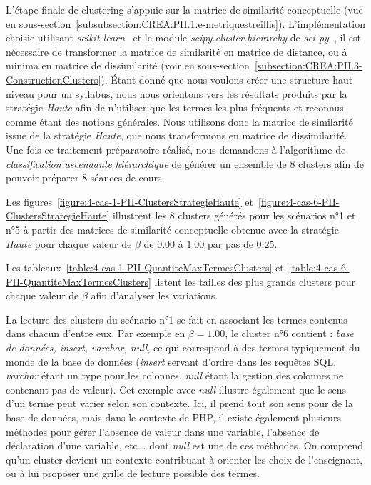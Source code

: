 L'étape finale de clustering s'appuie sur la matrice de similarité conceptuelle (vue en sous-section~\ref{subsubsection:CREA:PII.1.e-metriquestreillis}).
L'implémentation choisie utilisant \textit{scikit-learn}~\cite{scikit-learn} et le module \textit{scipy.cluster.hierarchy} de \textit{sci-py}~\cite{2020SciPy-NMeth}, il est nécessaire de transformer la matrice de similarité en matrice de distance, ou à minima en matrice de dissimilarité (voir en sous-section~\ref{subsection:CREA:PII.3-ConstructionClusters}).
Étant donné que nous voulons créer une structure haut niveau pour un syllabus, nous nous orientons vers les résultats produits par la stratégie \textit{Haute} afin de n'utiliser que les termes les plus fréquents et reconnus comme étant des notions générales.
Nous utilisons donc la matrice de similarité issue de la stratégie \textit{Haute}, que nous transformons en matrice de dissimilarité.
Une fois ce traitement préparatoire réalisé, nous demandons à l'algorithme de \textit{classification ascendante hiérarchique} de générer un ensemble de 8 clusters afin de pouvoir préparer 8 séances de cours.

\bigskip

Les figures~\ref{figure:4-cas-1-PII-ClustersStrategieHaute} et~\ref{figure:4-cas-6-PII-ClustersStrategieHaute} illustrent les 8 clusters générés pour les scénarios n°1 et n°5 à partir des matrices de similarité conceptuelle obtenue avec la stratégie \textit{Haute} pour chaque valeur de $ \beta $ de $ 0.00 $ à $ 1.00 $ par pas de $ 0.25 $.

Les tableaux~\ref{table:4-cas-1-PII-QuantiteMaxTermesClusters} et~\ref{table:4-cas-6-PII-QuantiteMaxTermesClusters} listent les tailles des plus grands clusters pour chaque valeur de $ \beta $ afin d'analyser les variations.

\bigskip

La lecture des clusters du scénario n°1 se fait en associant les termes contenus dans chacun d'entre eux.
Par exemple en $ \beta = 1.00 $, le cluster n°6 contient : \textit{base de données, insert, varchar, null}, ce qui correspond à des termes typiquement du monde de la base de données (\textit{insert} servant d'ordre dans les requêtes SQL, \textit{varchar} étant un type pour les colonnes, \textit{null} étant la gestion des colonnes ne contenant pas de valeur).
Cet exemple avec \textit{null} illustre également que le sens d'un terme peut varier selon son contexte.
Ici, il prend tout son sens pour de la base de données, mais dans le contexte de PHP, il existe également plusieurs méthodes pour gérer l'absence de valeur dans une variable, l'absence de déclaration d'une variable, etc... dont \textit{null} est une de ces méthodes.
On comprend qu'un cluster devient un contexte contribuant à orienter les choix de l'enseignant, ou à lui proposer une grille de lecture possible des termes.

